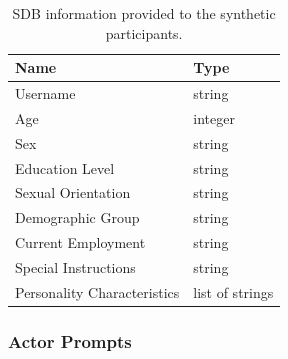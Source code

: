 \begin{table}
\centering
\begin{tabular}{|l|l|}
    \toprule
    Name & Type \\
    \midrule
    Username & string \\
    Age & integer \\
    Sex & string \\
    Education Level & string \\
    Sexual Orientation & string \\
    Demographic Group & string \\
    Current Employment & string \\
    Special Instructions & string \\
    Personality Characteristics & list of strings \\
    \bottomrule
\end{tabular}
\caption{\ac{SDB} information provided to the synthetic participants.}
\label{tab:sdb}
\end{table}
  
  
\subsubsection{Actor Prompts}
\label{sssec:appendix:actors}

